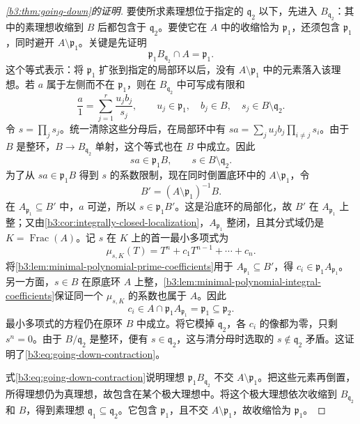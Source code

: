 \begin{proof}[\cref{b3:thm:going-down}的证明]
	要使所求素理想位于指定的 \(\mathfrak q_2\) 以下，先进入 \(B_{\mathfrak q_2}\)：其中的素理想收缩到 \(B\) 后都包含于 \(\mathfrak q_2\)。要使它在 \(A\) 中的收缩恰为 \(\mathfrak p_1\)，还须包含 \(\mathfrak p_1\)，同时避开 \(A\setminus\mathfrak p_1\)。关键是先证明
	\begin{equation}\label{b3:eq:going-down-contraction}
		\mathfrak p_1B_{\mathfrak q_2}\cap A=\mathfrak p_1.
	\end{equation}
	这个等式表示：将 \(\mathfrak p_1\) 扩张到指定的局部环以后，没有 \(A\setminus\mathfrak p_1\) 中的元素落入该理想。若 \(a\) 属于左侧而不在 \(\mathfrak p_1\)，则在 \(B_{\mathfrak q_2}\) 中可写成有限和
	\[
		\dfrac a1=\sum_{j=1}^r\dfrac{u_jb_j}{s_j}, \qquad u_j\in\mathfrak p_1,\quad b_j\in B,\quad s_j\in B\setminus\mathfrak q_2.
	\]
	令 \(s=\prod_js_j\)。统一清除这些分母后，在局部环中有 \(sa=\sum_j u_jb_j\prod_{i\ne j}s_i\)。由于 \(B\) 是整环，\(B\to B_{\mathfrak q_2}\) 单射，这个等式也在 \(B\) 中成立。因此
	\[
		sa\in\mathfrak p_1B,\qquad s\in B\setminus\mathfrak q_2.
	\]
	为了从 \(sa\in\mathfrak p_1B\) 得到 \(s\) 的系数限制，现在同时倒置底环中的 \(A\setminus\mathfrak p_1\)，令
	\[
		B'=(A\setminus\mathfrak p_1)^{-1}B.
	\]
	在 \(A_{\mathfrak p_1}\subseteq B'\) 中，\(a\) 可逆，所以 \(s\in\mathfrak p_1B'\)。这是沿底环的局部化，故 \(B'\) 在 \(A_{\mathfrak p_1}\) 上整；又由\cref{b3:cor:integrally-closed-localization}，\(A_{\mathfrak p_1}\) 整闭，且其分式域仍是 \(K=\operatorname{Frac}(A)\)。记 \(s\) 在 \(K\) 上的首一最小多项式为
	\[
		\mu_{s,K}(T)=T^n+c_1T^{n-1}+\cdots+c_n.
	\]
	将\cref{b3:lem:minimal-polynomial-prime-coefficients}用于 \(A_{\mathfrak p_1}\subseteq B'\)，得 \(c_i\in\mathfrak p_1A_{\mathfrak p_1}\)。另一方面，\(s\in B\) 在原底环 \(A\) 上整，\cref{b3:lem:minimal-polynomial-integral-coefficients}保证同一个 \(\mu_{s,K}\) 的系数也属于 \(A\)。因此
	\[
		c_i\in A\cap\mathfrak p_1A_{\mathfrak p_1}=\mathfrak p_1\subseteq\mathfrak p_2.
	\]
	最小多项式的方程仍在原环 \(B\) 中成立。将它模掉 \(\mathfrak q_2\)，各 \(c_i\) 的像都为零，只剩 \(s^n=0\)。由于 \(B/\mathfrak q_2\) 是整环，便有 \(s\in\mathfrak q_2\)，这与清分母时选取的 \(s\notin\mathfrak q_2\) 矛盾。这证明了\eqref{b3:eq:going-down-contraction}。

	式\eqref{b3:eq:going-down-contraction}说明理想 \(\mathfrak p_1B_{\mathfrak q_2}\) 不交 \(A\setminus\mathfrak p_1\)。把这些元素再倒置，所得理想仍为真理想，故包含在某个极大理想中。将这个极大理想依次收缩到 \(B_{\mathfrak q_2}\) 和 \(B\)，得到素理想 \(\mathfrak q_1\subseteq\mathfrak q_2\)。它包含 \(\mathfrak p_1\)，且不交 \(A\setminus\mathfrak p_1\)，故收缩恰为 \(\mathfrak p_1\)。
\end{proof}

